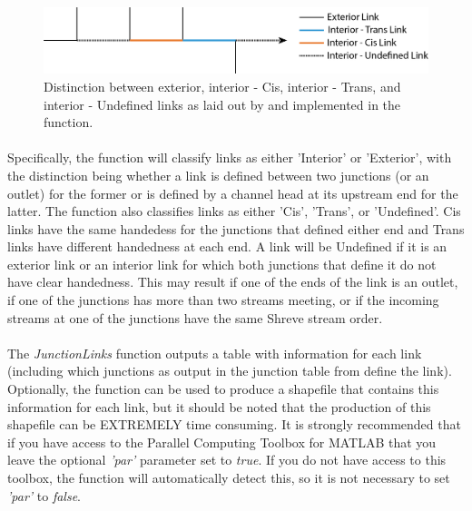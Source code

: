 \begin{figure}[H]
	\centering
	\includegraphics[width=14cm]{PNGs/JL_Cartoon.png}
	\caption{ Distinction between exterior, interior - Cis, interior - Trans, and interior - Undefined links as laid out by \cite{James1969} and implemented in the  function.} 
	\label{fig:JuncLinkCart}
\end{figure}

\paragraph{}Specifically, the function will classify links as either 'Interior' or 'Exterior', with the distinction being whether a link is defined between two junctions (or an outlet) for the former or is defined by a channel head at its upstream end for the latter. The function also classifies links as either 'Cis', 'Trans', or 'Undefined'. Cis links have the same handedess for the junctions that defined either end and Trans links have different handedness at each end. A link will be Undefined if it is an exterior link or an interior link for which both junctions that define it do not have clear handedness. This may result if one of the ends of the link is an outlet, if one of the junctions has more than two streams meeting, or if the incoming streams at one of the junctions have the same Shreve stream order.

\paragraph{}The \textit{JunctionLinks} function outputs a table with information for each link (including which junctions as output in the junction table from  define the link). Optionally, the function can be used to produce a shapefile that contains this information for each link, but it should be noted that the production of this shapefile can be EXTREMELY time consuming. It is strongly recommended that if you have access to the Parallel Computing Toolbox for MATLAB that you leave the optional \textit{'par'} parameter set to \textit{true}. If you do not have access to this toolbox, the function will automatically detect this, so it is not necessary to set \textit{'par'} to \textit{false}.

